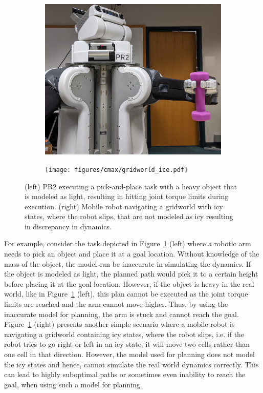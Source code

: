 \begin{figure}[t]
  \centering
  \begin{subfigure}{.5\columnwidth}
    \includegraphics[width=\linewidth]{figures/cmax/pr2_dumbbell_full.jpg}
  \end{subfigure}
  \begin{subfigure}{.4\columnwidth}
    \texttt{[image: figures/cmax/gridworld\_ice.pdf]}
  \end{subfigure}  
  \caption{(left) PR2 executing a pick-and-place task with a heavy
    object that is modeled as light, resulting in hitting joint torque
    limits during execution. (right) Mobile
    robot navigating a gridworld with icy states, where the robot slips, that are not modeled
    as icy resulting in discrepancy in dynamics.}
  \label{fig:intro}
  
\end{figure}

For example, consider the task depicted in Figure~\ref{fig:intro}
(left) where a robotic arm needs to pick an object and place it at a
goal location. Without knowledge of the mass of the object, the model
can be inaccurate in simulating the dynamics. If the object is modeled
as light, the planned 
path would pick it to a certain height before placing it at the
goal location. However, if the object is heavy in the real world, like
in Figure~\ref{fig:intro} (left), this plan cannot be executed as the
joint torque limits are reached and the arm cannot move higher. Thus, by
using the inaccurate model for planning, the arm is stuck and cannot reach the
goal. Figure~\ref{fig:intro} (right) presents another simple scenario
where a mobile robot is navigating a gridworld containing icy
states, where the robot slips, i.e.
if the robot tries to go right or left in an icy state, it will move two cells rather
than one cell in that direction. However, the model used for planning
does not model the icy states and hence, cannot
simulate the real world dynamics correctly. This can lead to highly
suboptimal paths or sometimes even inability to reach the goal, when using such a model for planning.

